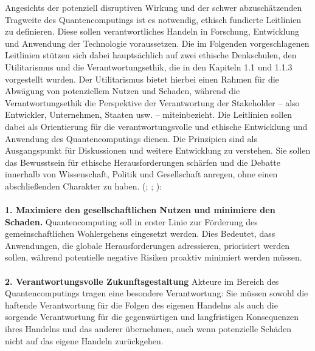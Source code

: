 Angesichts der potenziell disruptiven Wirkung und der schwer abzuschätzenden Tragweite des Quantencomputings ist es notwendig, ethisch fundierte Leitlinien zu definieren. Diese sollen verantwortliches Handeln in Forschung, Entwicklung und Anwendung der Technologie voraussetzen. Die im Folgenden vorgeschlagenen Leitlinien stützen sich dabei hauptsächlich auf zwei ethische Denkschulen, den Utilitarismus und die Verantwortungsethik, die in den Kapiteln 1.1 und 1.1.3 vorgestellt wurden. Der Utilitarismus bietet hierbei einen Rahmen für die Abwägung von potenziellem Nutzen und Schaden, während die Verantwortungsethik die Perspektive der Verantwortung der Stakeholder – also Entwickler, Unternehmen, Staaten usw. – miteinbezieht. Die Leitlinien sollen dabei als Orientierung für die verantwortungsvolle und ethische Entwicklung und Anwendung des Quantencomputings dienen. Die Prinzipien sind als Ausgangspunkt für Diskussionen und weitere Entwicklung zu verstehen. Sie sollen das Bewusstsein für ethische Herausforderungen schärfen und die Debatte innerhalb von Wissenschaft, Politik und Gesellschaft anregen, ohne einen abschließenden Charakter zu haben. (\cite{kop_quantum-elspi_2023}; \cite{kop_establishing_nodate};  \cite{european_commission_directorate_general_for_communications_networks_content_and_technology_ethik-leitlinien_2019}):
\\
\\
\textbf{1. Maximiere den gesellschaftlichen Nutzen und minimiere den Schaden.}
Quantencomputing soll in erster Linie zur Förderung des gemeinschaftlichen Wohlergehens eingesetzt werden. Dies Bedeutet, dass Anwendungen, die globale Herausforderungen adressieren, priorisiert werden sollen, während potentielle negative Risiken proaktiv minimiert werden müssen. 
\\
\\
\textbf{2. Verantwortungsvolle Zukunftsgestaltung }
Akteure im Bereich des Quantencomputings tragen eine besondere Verantwortung: Sie müssen sowohl die haftende Verantwortung für die Folgen des eigenen Handelns als auch die sorgende Verantwortung für die gegenwärtigen und langfristigen Konsequenzen ihres Handelns und das anderer übernehmen, auch wenn potenzielle Schäden nicht auf das eigene Handeln zurückgehen.
\\
\\
